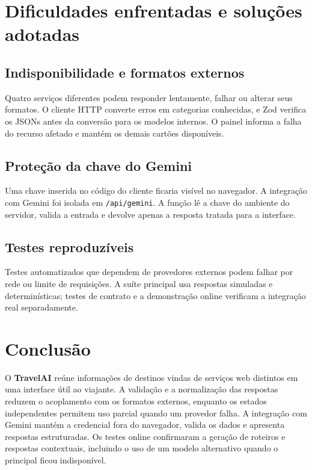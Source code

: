 \documentclass[a4paper,11pt]{article}
\begin{document}
\section{Dificuldades enfrentadas e soluções adotadas}
\subsection{Indisponibilidade e formatos externos}
Quatro serviços diferentes podem responder lentamente, falhar ou alterar seus formatos. O cliente HTTP converte erros em categorias conhecidas, e Zod verifica os JSONs antes da conversão para os modelos internos. O painel informa a falha do recurso afetado e mantém os demais cartões disponíveis.

\subsection{Proteção da chave do Gemini}
Uma chave inserida no código do cliente ficaria visível no navegador. A integração com Gemini foi isolada em \texttt{/api/gemini}. A função lê a chave do ambiente do servidor, valida a entrada e devolve apenas a resposta tratada para a interface.

\subsection{Testes reproduzíveis}
Testes automatizados que dependem de provedores externos podem falhar por rede ou limite de requisições. A suíte principal usa respostas simuladas e determinísticas; testes de contrato e a demonstração online verificam a integração real separadamente.

\section{Conclusão}
O \textbf{TravelAI} reúne informações de destinos vindas de serviços web distintos em uma interface útil ao viajante. A validação e a normalização das respostas reduzem o acoplamento com os formatos externos, enquanto os estados independentes permitem uso parcial quando um provedor falha. A integração com Gemini mantém a credencial fora do navegador, valida os dados e apresenta respostas estruturadas. Os testes online confirmaram a geração de roteiros e respostas contextuais, incluindo o uso de um modelo alternativo quando o principal ficou indisponível.
\end{document}

